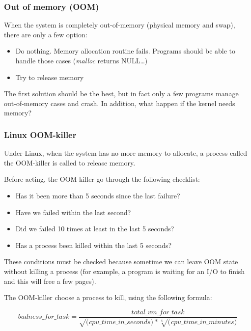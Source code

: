 
\begin{frame}
  \frametitle{Out of memory (OOM)}

  When the system is completely out-of-memory (physical memory and
  swap), there are only a few option:

  \begin{itemize}
  \item
    Do nothing. Memory allocation routine fails. Programs should be
    able to handle those cases (\emph{malloc} returns NULL\ldots)
  \item
    Try to release memory
  \end{itemize}

  \-

  The first solution should be the best, but in fact only a few
  programs manage out-of-memory cases and crash. In addition, what
  happen if the kernel needs memory?

\end{frame}


\begin{frame}
  \frametitle{Linux OOM-killer}

  Under Linux, when the system has no more memory to allocate, a
  process called the OOM-killer is called to release memory.

  \-

  Before acting, the OOM-killer go through the following checklist:

  \begin{itemize}
  \item
    Has it been more than 5 seconds since the last failure?
  \item
    Have we failed within the last second?
  \item
    Did we failed 10 times at least in the last 5 seconds?
  \item
    Has a process been killed within the last 5 seconds?
  \end{itemize}

  \-

  These conditions must be checked because sometime we can leave OOM
  state without killing a process (for example, a program is waiting
  for an I/O to finish and this will free a few pages).

  \-

  The OOM-killer choose a process to kill, using the following
  formula:

  $$badness\_for\_task = \frac{total\_vm\_for\_task}
  {\sqrt(cpu\_time\_in\_seconds) * \sqrt[4](cpu\_time\_in\_minutes)}$$

\end{frame}

